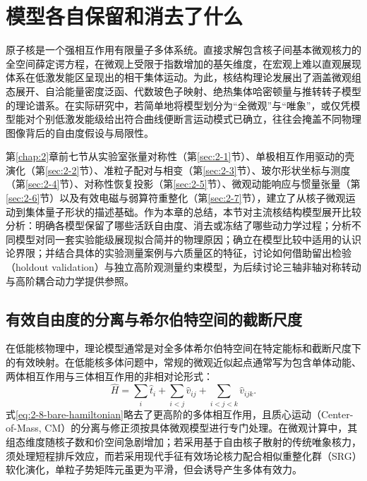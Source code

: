 \section{模型各自保留和消去了什么}\label{sec:2-8}

原子核是一个强相互作用有限量子多体系统。直接求解包含核子间基本微观核力的全空间薛定谔方程，在微观上受限于指数增加的基矢维度，在宏观上难以直观展现体系在低激发能区呈现出的相干集体运动。为此，核结构理论发展出了涵盖微观组态展开、自洽能量密度泛函、代数玻色子映射、绝热集体哈密顿量与推转转子模型的理论谱系。在实际研究中，若简单地将模型划分为“全微观”与“唯象”，或仅凭模型能对个别低激发能级给出符合曲线便断言运动模式已确立，往往会掩盖不同物理图像背后的自由度假设与局限性。

第\ref{chap:2}章前七节从实验室张量对称性（第\ref{sec:2-1}节）、单极相互作用驱动的壳演化（第\ref{sec:2-2}节）、准粒子配对与相变（第\ref{sec:2-3}节）、玻尔形状坐标与测度（第\ref{sec:2-4}节）、对称性恢复投影（第\ref{sec:2-5}节）、微观动能响应与惯量张量（第\ref{sec:2-6}节）以及有效电磁与弱算符重整化（第\ref{sec:2-7}节），建立了从核子微观运动到集体量子形状的描述基础。作为本章的总结，本节对主流核结构模型展开比较分析：明确各模型保留了哪些活跃自由度、消去或冻结了哪些动力学过程；分析不同模型对同一套实验能级展现拟合简并的物理原因；确立在模型比较中适用的认识论界限；并结合具体的实验测量案例与六质量区的特征，讨论如何借助留出检验（holdout validation）与独立高阶观测量约束模型，为后续讨论三轴非轴对称转动与高阶耦合动力学提供参照。\cite{bohr-mottelson-1953-collective-individual-original,book-bohr-mottelson-nuclear-structure-vol2,prochniak-rohozinski-2009-bohr-collective-hamiltonian,poves-2020-limits-assigning-nuclear-shape}

\subsection{有效自由度的分离与希尔伯特空间的截断尺度}\label{sec:2-8-1}

在低能核物理中，理论模型通常是对全多体希尔伯特空间在特定能标和截断尺度下的有效映射。在低能核多体问题中，常规的微观近似起点通常写为包含单体动能、两体相互作用与三体相互作用的非相对论形式：
\begin{equation}\label{eq:2-8-bare-hamiltonian}
\hat{H} = \sum_{i} \hat{t}_i + \sum_{i<j} \hat{v}_{ij} + \sum_{i<j<k} \hat{v}_{ijk} .
\end{equation}
式\eqref{eq:2-8-bare-hamiltonian}略去了更高阶的多体相互作用，且质心运动（Center-of-Mass, CM）的分离与修正须按具体微观模型进行专门处理。在微观计算中，其组态维度随核子数和价空间急剧增加；若采用基于自由核子散射的传统唯象核力，须处理短程排斥效应，而若采用现代手征有效场论核力配合相似重整化群（SRG）软化演化，单粒子势矩阵元虽更为平滑，但会诱导产生多体有效力。


